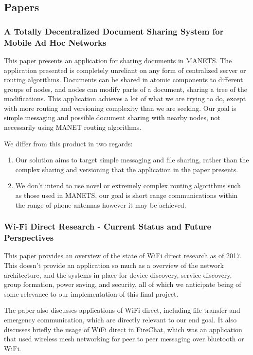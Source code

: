 \documentclass[10pt]{article}
\begin{document}
\subsection{Papers}

\subsubsection{A Totally Decentralized Document Sharing System for Mobile Ad Hoc Networks}

This paper  \cite{10.1145/1164783.1164805} presents an application for sharing documents in MANETS. The application presented is completely unreliant on any form of centralized server or routing algorithms. Documents can be shared in atomic components to different groups of nodes, and nodes can modify parts of a document, sharing a tree of the modifications. This application achieves a lot of what we are trying to do, except with more routing and versioning complexity than we are seeking. Our goal is simple messaging and possible document sharing with nearby nodes, not necessarily using MANET routing algorithms.

We differ from this product in two regards:
\begin{enumerate}
    \item Our solution aims to target simple messaging and file sharing, rather than the complex sharing and versioning that the application in the paper presents.
    \item We don't intend to use novel or extremely complex routing algorithms such as those used in MANETS, our goal is short range communications within the range of phone antennas however it may be achieved.
\end{enumerate}

\subsubsection{Wi-Fi Direct Research - Current Status and Future Perspectives}
This paper  \cite{WifiDirect} provides an overview of the state of WiFi direct research as of 2017. This doesn't provide an application so much as a overview of the network architecture, and the systems in place for device discovery, service discovery, group formation, power saving, and security, all of which we anticipate being of some relevance to our implementation of this final project.

The paper also discusses applications of WiFi direct, including file transfer and emergency communication, which are directly relevant to our end goal. It also discusses briefly the usage of WiFi direct in FireChat, which was an application that used wireless mesh networking for peer to peer messaging over bluetooth or WiFi.
\end{document}
